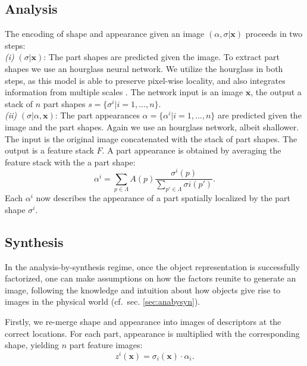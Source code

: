 	\subsection{Analysis}

		The encoding of shape and appearance given an image ${(\alpha, \sigma | \mathbf{x})}$ proceeds in two steps: \\
		\emph{(i)} $(\sigma |\mathbf{x})$: The part shapes are predicted given the image. To extract part shapes we use an hourglass neural network. We utilize the hourglass in both steps, as this model is able to preserve pixel-wise locality, and also integrates information from multiple scales \cite{newell16hourglass}. The network input is an image $\mathbf{x}$, the output a stack of $n$ part shapes $s =  \{ {\sigma}^i| i=1, ...,  n\}$.\\
		\emph{(ii)} $(\sigma| \alpha , \mathbf{x})$: The part appearances $\alpha =  \{\alpha^i \vert i=1, ...,  n\}$ are predicted given the image and the part shapes. Again we use an hourglass network, albeit shallower. The input is the original image concatenated with the stack of part shapes. The output is a feature stack $F$. A part appearance is obtained by averaging the feature stack with the a part shape:
		\begin{equation}
			\alpha^i = \sum_{p \in \Lambda} A(p) \frac{{\sigma}^i(p)}{\sum_{p' \in \Lambda}{\sigma}i(p')}.
		\end{equation}
		Each $\alpha^i$ now describes the appearance of a part spatially localized by the part shape ${\sigma}^i$. \\


	\subsection{Synthesis}
		In the analysis-by-synthesis regime, once the object representation is successfully factorized, one can make assumptions on how the factors reunite to generate an image, following the knowledge and intuition about how objects give rise to images in the physical world (cf.\ sec. \ref{sec:anabysyn}).


		Firstly, we re-merge shape and appearance into images of descriptors at the correct locations. For each part, appearance is multiplied with the corresponding shape, yielding $n$ part feature images:
		\begin{equation}
			z^i(\mathbf{x}) = {\sigma}_i(\mathbf{x}) \cdot \alpha_i .
		\end{equation}


